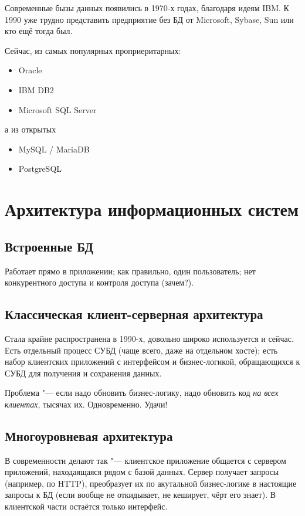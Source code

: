 Современные бызы данных появились в 1970-х годах, благодаря идеям IBM.
К 1990 уже трудно представить предприятие без БД от Microsoft, Sybase, Sun или кто ещё тогда был.

\begin{samepage}
	Сейчас, из самых популярных проприеритарных:
	\begin{itemize}
		\item Oracle
		\item IBM DB2
		\item Microsoft SQL Server
	\end{itemize}
	а из открытых
	\begin{itemize}
		\item MySQL / MariaDB
		\item PostgreSQL
	\end{itemize}
\end{samepage}

\section{Архитектура информационных систем}

\subsection{Встроенные БД}
Работает прямо в приложении; как правильно, один пользователь; нет конкурентного доступа и контроля доступа (зачем?).

\subsection{Классическая клиент-серверная архитектура}
Стала крайне распространена в 1990-х, довольно широко используется и сейчас.
Есть отдельный процесс СУБД (чаще всего, даже на отдельном хосте); есть набор клиентских приложений с интерфейсом и бизнес-логикой,
обращающихся к СУБД для получения и сохранения данных.

Проблема "--- если надо обновить бизнес-логику, надо обновить код \textit{на всех клиентах}, тысячах их. Одновременно. Удачи!

\subsection{Многоуровневая архитектура}
В современности делают так "--- клиентское приложение общается с сервером приложений, находаящаяся рядом с базой данных.
Сервер получает запросы (например, по HTTP), преобразует их по акутальной бизнес-логике в настоящие запросы к БД
(если вообще не откидывает, не кеширует, чёрт его знает). В клиентской части остаётся только интерфейс.
